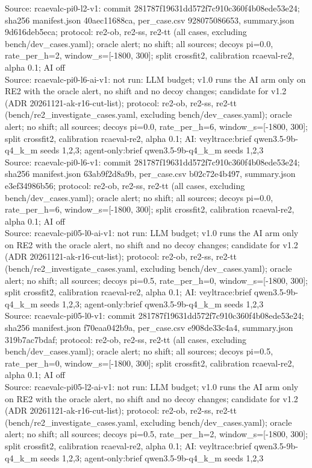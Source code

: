 \begin{table}[t]
Source: rcaevalc-pi0-l2-v1: commit 281787f19631dd572f7c910c360f4b08ede53e24; sha256 manifest.json 40aec11688ca, per\_case.csv 928075086653, summary.json 9d616deb5eca; protocol: re2-ob, re2-ss, re2-tt (all cases, excluding bench/dev\_cases.yaml); oracle alert; no shift; all sources; decoys pi=0.0, rate\_per\_h=2, window\_s=[-1800, 300]; split crossfit2, calibration rcaeval-re2, alpha 0.1; AI off\\
Source: rcaevalc-pi0-l6-ai-v1: not run: LLM budget; v1.0 runs the AI arm only on RE2 with the oracle alert, no shift and no decoy changes; candidate for v1.2 (ADR 20261121-ak-r16-cut-list); protocol: re2-ob, re2-ss, re2-tt (bench/re2\_investigate\_cases.yaml, excluding bench/dev\_cases.yaml); oracle alert; no shift; all sources; decoys pi=0.0, rate\_per\_h=6, window\_s=[-1800, 300]; split crossfit2, calibration rcaeval-re2, alpha 0.1; AI: veyltrace:brief qwen3.5-9b-q4\_k\_m seeds 1,2,3; agent-only:brief qwen3.5-9b-q4\_k\_m seeds 1,2,3\\
Source: rcaevalc-pi0-l6-v1: commit 281787f19631dd572f7c910c360f4b08ede53e24; sha256 manifest.json 63ab9f2d8a9b, per\_case.csv b02c72e4b497, summary.json e3ef34986b56; protocol: re2-ob, re2-ss, re2-tt (all cases, excluding bench/dev\_cases.yaml); oracle alert; no shift; all sources; decoys pi=0.0, rate\_per\_h=6, window\_s=[-1800, 300]; split crossfit2, calibration rcaeval-re2, alpha 0.1; AI off\\
Source: rcaevalc-pi05-l0-ai-v1: not run: LLM budget; v1.0 runs the AI arm only on RE2 with the oracle alert, no shift and no decoy changes; candidate for v1.2 (ADR 20261121-ak-r16-cut-list); protocol: re2-ob, re2-ss, re2-tt (bench/re2\_investigate\_cases.yaml, excluding bench/dev\_cases.yaml); oracle alert; no shift; all sources; decoys pi=0.5, rate\_per\_h=0, window\_s=[-1800, 300]; split crossfit2, calibration rcaeval-re2, alpha 0.1; AI: veyltrace:brief qwen3.5-9b-q4\_k\_m seeds 1,2,3; agent-only:brief qwen3.5-9b-q4\_k\_m seeds 1,2,3\\
Source: rcaevalc-pi05-l0-v1: commit 281787f19631dd572f7c910c360f4b08ede53e24; sha256 manifest.json f70eaa042b9a, per\_case.csv e908de33c4a4, summary.json 319b7ac7bdaf; protocol: re2-ob, re2-ss, re2-tt (all cases, excluding bench/dev\_cases.yaml); oracle alert; no shift; all sources; decoys pi=0.5, rate\_per\_h=0, window\_s=[-1800, 300]; split crossfit2, calibration rcaeval-re2, alpha 0.1; AI off\\
Source: rcaevalc-pi05-l2-ai-v1: not run: LLM budget; v1.0 runs the AI arm only on RE2 with the oracle alert, no shift and no decoy changes; candidate for v1.2 (ADR 20261121-ak-r16-cut-list); protocol: re2-ob, re2-ss, re2-tt (bench/re2\_investigate\_cases.yaml, excluding bench/dev\_cases.yaml); oracle alert; no shift; all sources; decoys pi=0.5, rate\_per\_h=2, window\_s=[-1800, 300]; split crossfit2, calibration rcaeval-re2, alpha 0.1; AI: veyltrace:brief qwen3.5-9b-q4\_k\_m seeds 1,2,3; agent-only:brief qwen3.5-9b-q4\_k\_m seeds 1,2,3\\

\end{table}
